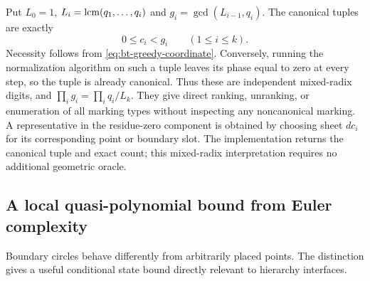 \begin{remark}\label{rem:bt-indexing}
Put $L_0=1$, $L_i=\operatorname{lcm}(q_1,\ldots,q_i)$ and
$g_i=\gcd(L_{i-1},q_i)$.  The canonical tuples are exactly
\[
 0\le c_i<g_i\qquad(1\le i\le k).
\]
Necessity follows from \eqref{eq:bt-greedy-coordinate}.  Conversely,
running the normalization algorithm on such a tuple leaves its phase
equal to zero at every step, so the tuple is already canonical.  Thus
these are independent mixed-radix digits, and
$\prod_i g_i=\prod_iq_i/L_k$.  They give direct ranking, unranking, or
enumeration of all marking types without inspecting any noncanonical
marking.  A representative in the residue-zero component is obtained
by choosing sheet $dc_i$ for its corresponding point or boundary slot.
The implementation returns the canonical tuple and exact count; this
mixed-radix interpretation requires no additional geometric oracle.
\end{remark}

\subsection{A local quasi-polynomial bound from Euler complexity}

Boundary circles behave differently from arbitrarily placed points.
The distinction gives a useful conditional state bound directly relevant
to hierarchy interfaces.

